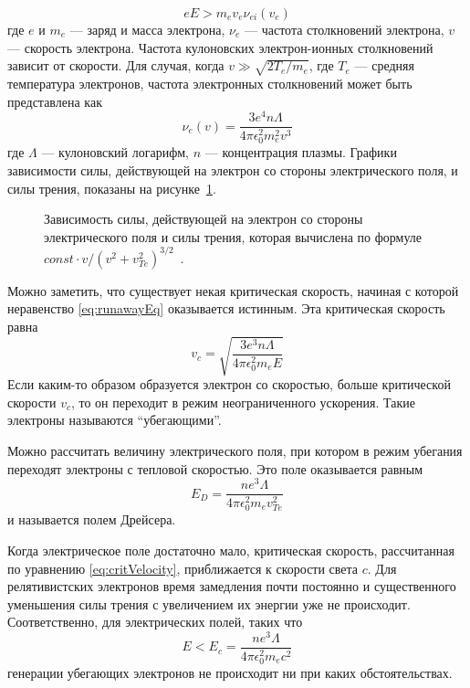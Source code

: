 \begin{equation}
  \label{eq:runawayEq}
  e E >  m_e v_e \nu_{ei}(v_e)
\end{equation}
где $e$ и $m_e$ --- заряд и масса электрона, $\nu_{e}$ --- частота столкновений электрона, $v$ --- скорость электрона. Частота кулоновских электрон-ионных столкновений зависит от скорости. Для случая, когда $v \gg \sqrt{ 2 T_e / m_e }$, где $T_e$ --- средняя температура электронов, частота электронных столкновений может быть представлена как~\cite{Wesson2004}
\begin{equation*}
  \nu_{e}(v) = \frac{ 3 e^4 n \Lambda }{ 4 \pi \epsilon_0^2 m_e^2 v^3 }
\end{equation*} 
где $\Lambda$ --- кулоновский логарифм, $n$ --- концентрация плазмы. Графики зависимости силы, действующей на электрон со стороны электрического поля, и силы трения, показаны на рисунке~\ref{fig:runawayForces}.

\begin{figure}[ht]
  \caption{ Зависимость силы, действующей на электрон со стороны электрического поля и силы трения, которая вычислена по формуле $ const \cdot v/( v^2 + v_{Te}^2 )^{3/2} $~\cite{Golant1977}.}
  \label{fig:runawayForces}
\end{figure}

Можно заметить, что существует некая критическая скорость, начиная с которой неравенство \ref{eq:runawayEq} оказывается истинным. Эта критическая скорость равна
\begin{equation}
  \label{eq:critVelocity}
  v_c = \sqrt{ \frac{ 3 e^3 n \Lambda }{ 4 \pi \epsilon_0^2 m_e E } }
\end{equation}
Если каким-то образом образуется электрон со скоростью, больше критической скорости $v_c$, то он переходит в режим неограниченного ускорения. Такие электроны называются ``убегающими''.~\cite{Golant1977}

Можно рассчитать величину электрического поля, при котором в режим убегания переходят электроны с тепловой скоростью. Это поле оказывается равным 
\begin{equation}
  \label{eq:dreicerField}
  E_D = \frac{ n e^3 \Lambda }{ 4 \pi \epsilon_0^2 m_e v_{Te}^2 }
\end{equation}
и называется полем Дрейсера.~\cite{Dreicer1959,Golant1977,Wesson2004}

Когда электрическое поле достаточно мало, критическая скорость, рассчитанная по уравнению \ref{eq:critVelocity}, приближается к скорости света $c$. Для релятивистских электронов время замедления почти постоянно и существенного уменьшения силы трения с увеличением их энергии уже не происходит. Соответственно, для электрических полей, таких что
\begin{equation}
  \label{eq:criticalField}
  E < E_c = \frac{ n e^3 \Lambda }{ 4 \pi \epsilon_0^2 m_e c^2 }
\end{equation}
генерации убегающих электронов не происходит ни при каких обстоятельствах.~\cite{Wesson2004}


